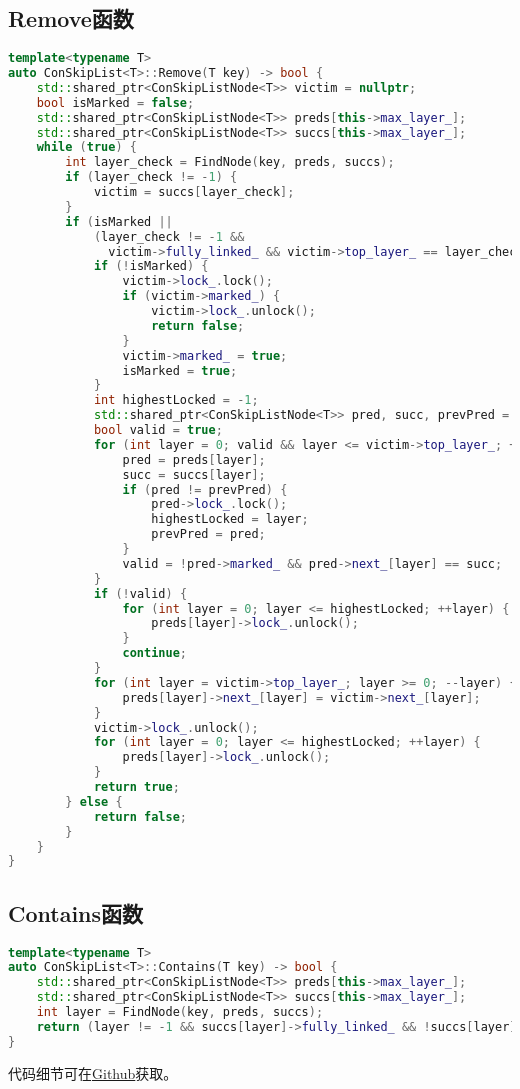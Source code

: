 \documentclass[UTF8, 10pt, twocolumn]{article}
\begin{document}
\subsection{Remove函数}
\begin{lstlisting}[language=c++]
template<typename T>
auto ConSkipList<T>::Remove(T key) -> bool {
    std::shared_ptr<ConSkipListNode<T>> victim = nullptr;
    bool isMarked = false;
    std::shared_ptr<ConSkipListNode<T>> preds[this->max_layer_];
    std::shared_ptr<ConSkipListNode<T>> succs[this->max_layer_];
    while (true) {
        int layer_check = FindNode(key, preds, succs);
        if (layer_check != -1) {
            victim = succs[layer_check];
        }
        if (isMarked ||
            (layer_check != -1 &&
              victim->fully_linked_ && victim->top_layer_ == layer_check && !victim->marked_)) {
            if (!isMarked) {
                victim->lock_.lock();
                if (victim->marked_) {
                    victim->lock_.unlock();
                    return false;
                }
                victim->marked_ = true;
                isMarked = true;
            }
            int highestLocked = -1;
            std::shared_ptr<ConSkipListNode<T>> pred, succ, prevPred = nullptr;
            bool valid = true;
            for (int layer = 0; valid && layer <= victim->top_layer_; ++layer) {
                pred = preds[layer];
                succ = succs[layer];
                if (pred != prevPred) {
                    pred->lock_.lock();
                    highestLocked = layer;
                    prevPred = pred;
                }
                valid = !pred->marked_ && pred->next_[layer] == succ;
            }
            if (!valid) {
                for (int layer = 0; layer <= highestLocked; ++layer) {
                    preds[layer]->lock_.unlock();
                }
                continue;
            }
            for (int layer = victim->top_layer_; layer >= 0; --layer) {
                preds[layer]->next_[layer] = victim->next_[layer];
            }
            victim->lock_.unlock();
            for (int layer = 0; layer <= highestLocked; ++layer) {
                preds[layer]->lock_.unlock();
            }
            return true;
        } else {
            return false;
        }
    }
}
\end{lstlisting}

\subsection{Contains函数}
\begin{lstlisting}[language=c++]
template<typename T>
auto ConSkipList<T>::Contains(T key) -> bool {
    std::shared_ptr<ConSkipListNode<T>> preds[this->max_layer_];
    std::shared_ptr<ConSkipListNode<T>> succs[this->max_layer_];
    int layer = FindNode(key, preds, succs);
    return (layer != -1 && succs[layer]->fully_linked_ && !succs[layer]->marked_);
}
\end{lstlisting}

代码细节可在\href{https://github.com/ziqiwww/nju-cat}{Github}获取。
\end{document}
